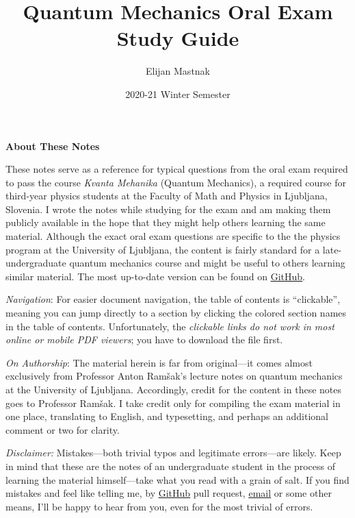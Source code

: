 \documentclass[11pt, a4paper]{article}
\begin{document}
\title{Quantum Mechanics Oral Exam Study Guide}
\author{Elijan Mastnak}
\date{2020-21 Winter Semester}
\maketitle

\thispagestyle{empty}  %

\begin{center}
\textbf{About These Notes}
\end{center}
These notes serve as a reference for typical questions from the oral exam required to pass the course \textit{Kvanta Mehanika} (Quantum Mechanics), a required course for third-year physics students at the Faculty of Math and Physics in Ljubljana, Slovenia. I wrote the notes while studying for the exam and am making them publicly available in the hope that they might help others learning the same material. Although the exact oral exam questions are specific to the the physics program at the University of Ljubljana, the content is fairly standard for a late-undergraduate quantum mechanics course and might be useful to others learning similar material. The most up-to-date version can be found on \href{https://github.com/ejmastnak/fmf/tree/main/quantum-mechanics}{\underline{GitHub}}.

\vspace{2mm}
\textit{Navigation}: For easier document navigation, the table of contents is ``clickable'', meaning you can jump directly to a section by clicking the colored section names in the table of contents. Unfortunately, the \textit{clickable links do not work in most online or mobile PDF viewers}; you have to download the file first.

\vspace{2mm}
\textit{On Authorship}: The material herein is far from original---it comes almost exclusively from Professor Anton Ram\v{s}ak's lecture notes on quantum mechanics at the University of Ljubljana. Accordingly, credit for the content in these notes goes to Professor Ram\v{s}ak. I take credit only for compiling the exam material in one place, translating to English, and typesetting, and perhaps an additional comment or two for clarity.

\vspace{2mm}
\textit{Disclaimer:} Mistakes---both trivial typos and legitimate errors---are likely. Keep in mind that these are the notes of an undergraduate student in the process of learning the material himself---take what you read with a grain of salt. If you find mistakes and feel like telling me, by \href{https://github.com/ejmastnak/fmf}{\underline{GitHub}} pull request, \href{mailto:ejmastnak@gmail.com}{\underline{email}} or some other means, I'll be happy to hear from you, even for the most trivial of errors.
\end{document}

